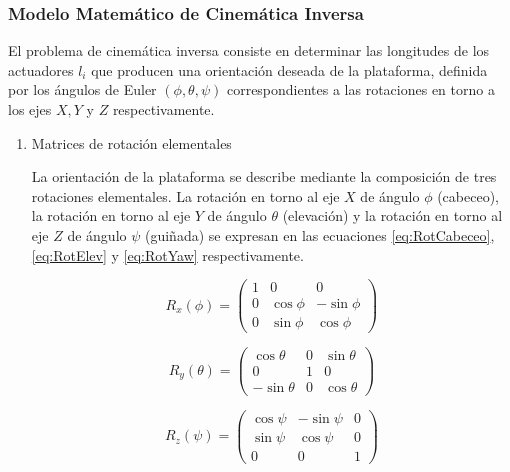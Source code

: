 \subsubsection{Modelo Matemático de Cinemática Inversa}\label{sec:Cin_Inv}

El problema de cinemática inversa consiste en determinar las longitudes de los actuadores $l_i$ que producen una orientación deseada de la plataforma, definida por los ángulos de Euler $(\phi, \theta, \psi)$ correspondientes a las rotaciones en torno a los ejes $X,Y$ y $Z$ respectivamente.

\begin{enumerate}

	\item{Matrices de rotación elementales}
	
La orientación de la plataforma se describe mediante la composición de tres rotaciones elementales. La rotación en torno al eje $X$ de ángulo $\phi$ (cabeceo), la rotación en torno al eje $Y$ de ángulo $\theta$ (elevación) y la rotación en torno al eje $Z$ de ángulo $\psi$ (guiñada) se expresan en las ecuaciones \eqref{eq:RotCabeceo}, \eqref{eq:RotElev} y \eqref{eq:RotYaw} respectivamente.

\begin{equation}
R_x(\phi)=
\begin{pmatrix}
1 & 0 & 0 \\
0 & \cos\phi & -\sin\phi \\
0 & \sin\phi & \cos\phi
\end{pmatrix}
\label{eq:RotCabeceo}
\end{equation}



\begin{equation}
R_y(\theta)=
\begin{pmatrix}
\cos\theta & 0 & \sin\theta \\
0 & 1 & 0 \\
-\sin\theta & 0 & \cos\theta
\end{pmatrix}
\label{eq:RotElev}
\end{equation}

\begin{equation}
R_z(\psi)=
\begin{pmatrix}
\cos\psi & -\sin\psi & 0 \\
\sin\psi & \cos\psi & 0 \\
0 & 0 & 1
\end{pmatrix}
\label{eq:RotYaw}
\end{equation}


\end{enumerate}
